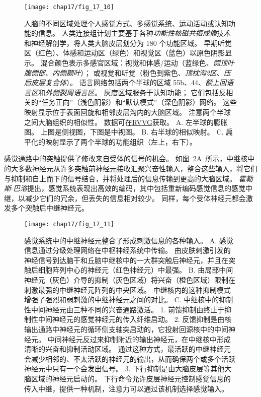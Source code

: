 \begin{figure}[htbp]
	\centering
	\texttt{[image: chap17/fig\_17\_10]}
	\caption{人脑的不同区域处理个人感觉方式、多感觉系统、运动活动或认知功能的信息。
		人类连接组计划主要基于各种\textit{功能性核磁共振成像}技术和神经解剖学，将人类大脑皮层划分为 180 个功能区域。
		早期听觉区（红色）、体感和运动区（绿色）和视觉区（蓝色）以原色阴影显示。
		混合颜色表示多感官区域：视觉和体感/运动（蓝绿色、\textit{侧顶叶腹侧部}、\textit{内侧颞叶}）；
		或视觉和听觉（粉色到紫色、\textit{顶枕沟2区}、\textit{压后皮层复合体}）。
		语言网络包括两个半球的区域 55b、44、\textit{额上回语言区}和\textit{外侧裂周语言区}。
		灰度区域服务于认知功能； 它们包括反相关的“任务正向”（浅色阴影）和“默认模式”（深色阴影）网络。 
		这些映射显示位于表面回旋和相邻皮层沟内的大脑区域。
		注意两个半球之间大脑组织的相似性\cite{glasser2016multi}。
		数据可在\href{https://balsa.wustl.edu/study/RVVG}{RVVG}获取。
		A. 左半球的膨胀图。 
		上图是侧视图，下图是中视图。
		B. 右半球的相似映射。
		C. 扁平化的映射显示了两个半球的功能组织（左上，右下）。}
	\label{fig:17_10}
\end{figure}


感觉通路中的突触提供了修改来自受体的信号的机会。 
如图~\ref{fig:17_11}A~所示，中继核中的大多数神经元从许多突触前神经元接收汇聚兴奋性输入，整合这些输入，将它们与抑制和自上而下的信号结合，并将处理后的信息传输到更高的大脑区域。
\textit{霍勒斯$\cdot$巴洛}提出，感觉系统表现出高效的编码，其中包括重新编码感觉信息的感觉中继，以减少它们的冗余，但丢失的信息相对较少。 
同样，每个受体神经元都会激发多个突触后中继神经元。


\begin{figure}[htbp]
	\centering
	\texttt{[image: chap17/fig\_17\_11]}
	\caption{感觉系统中的中继神经元整合了形成刺激信息的各种输入。 
		A. 感觉信息通过分级处理网络在中枢神经系统中传输。 
		由皮肤刺激引发的神经信号到达脑干和丘脑中继核中的一大群突触后神经元，并且在突触后细胞阵列中心的神经元（红色神经元）中最强\cite{biederman2013human}。
		B. 由局部中间神经元（灰色）介导的抑制（灰色区域）将兴奋（橙色区域）限制在刺激最强的中继神经元阵列的中央区域。 
		中继核内的这种抑制模式增强了强烈和弱刺激的中继神经元之间的对比。 
		C. 中继核中的抑制性中间神经元由三种不同的兴奋通路激活。 
		1. 前馈抑制由终止于抑制性中间神经元的感觉神经元的传入纤维启动。 
		2. 反馈抑制是由核输出通路中神经元的循环侧支轴突启动的，它投射回源核中的中间神经元。 
		中间神经元反过来抑制附近的输出神经元，在中继核中形成清晰的兴奋和抑制活动区域。 
		通过这种方式，最活跃的中继神经元会减少相邻的、不太活跃的神经元的输出，从而确保两个或多个活跃神经元中只有一个会发出信号。 
		3. 下行抑制是由大脑皮层等其他大脑区域的神经元启动的。 
		下行命令允许皮层神经元控制感觉信息的传入中继，提供一种机制，注意力可以通过该机制选择感觉输入。}
	\label{fig:17_11}
\end{figure}


